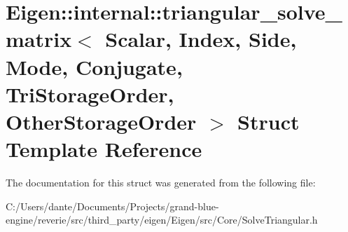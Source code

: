 \hypertarget{struct_eigen_1_1internal_1_1triangular__solve__matrix}{}\section{Eigen\+::internal\+::triangular\+\_\+solve\+\_\+matrix$<$ Scalar, Index, Side, Mode, Conjugate, Tri\+Storage\+Order, Other\+Storage\+Order $>$ Struct Template Reference}
\label{struct_eigen_1_1internal_1_1triangular__solve__matrix}


The documentation for this struct was generated from the following file\+:\begin{DoxyCompactItemize}
\item 
C\+:/\+Users/dante/\+Documents/\+Projects/grand-\/blue-\/engine/reverie/src/third\+\_\+party/eigen/\+Eigen/src/\+Core/Solve\+Triangular.\+h\end{DoxyCompactItemize}
